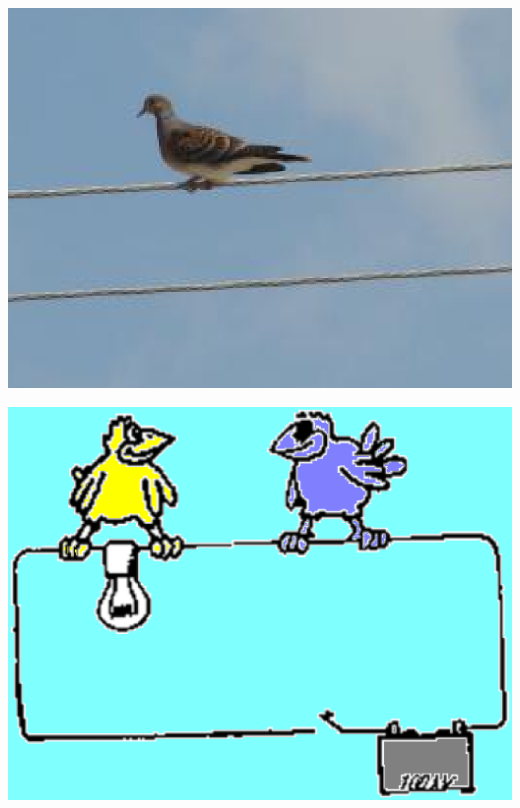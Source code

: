 \documentclass[../Elmag-labhefte-2020.tex]{subfiles}
\begin{document}
\begin{marginfigure}%
\RawFloats
    \begin{minipage}[b]{\linewidth}
        \centering
        \includegraphics[scale=0.82]{fig/BirdL.eps}
        \caption{%
            En fugl som sitter på en kraftlinje.
        }
        \label{fig:BirdA}
    \end{minipage}
    \hspace{0.1cm}
    \begin{minipage}[b]{\linewidth}
        \centering
        \includegraphics[scale=0.35]{fig/BirdC.eps}
        \caption{%
            Hva skjer når den slås på?
        }
        \label{fig:BirdB}
    \end{minipage}
\end{marginfigure}
\end{document}
